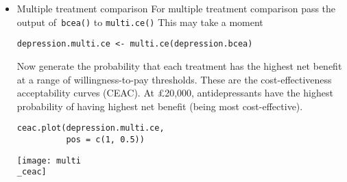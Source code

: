 \documentclass[a4paper,twoside,openany]{../svmonoBUGS}\usepackage[]{graphicx}\usepackage[]{color}
\begin{document}
\begin{itemize}
\item Multiple treatment comparison
For multiple treatment comparison pass the output of\texttt{ bcea()} to \texttt{multi.ce()}
This may take a moment
\begin{verbatim}
depression.multi.ce <- multi.ce(depression.bcea)
\end{verbatim}

Now generate the probability that each treatment has the highest net benefit at
a range of willingness-to-pay thresholds.
These are the cost-effectiveness acceptability curves (CEAC).
At £20,000, antidepressants have the highest probability of having highest net benefit (being most cost-effective).
\begin{verbatim}
ceac.plot(depression.multi.ce,
          pos = c(1, 0.5))
\end{verbatim}
\texttt{[image: multi\\\_ceac]}
\end{itemize}
\end{document}
